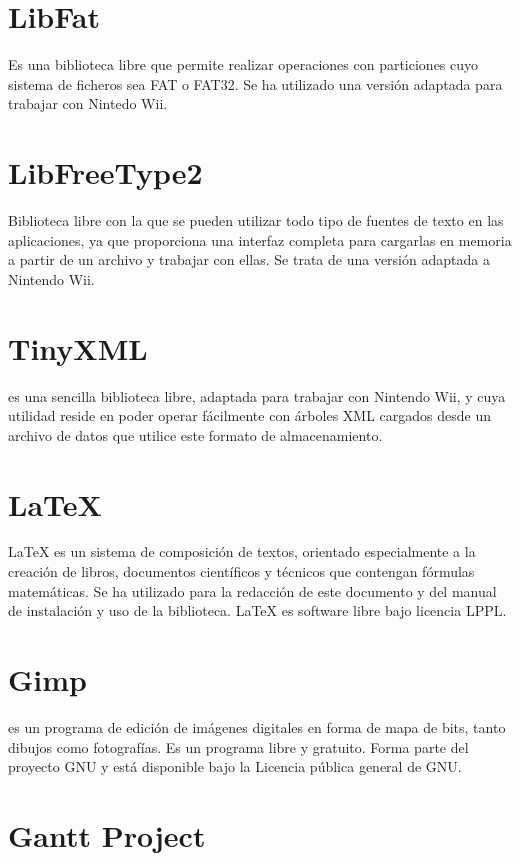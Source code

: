 \section*{LibFat}

Es una biblioteca libre que permite realizar operaciones con particiones cuyo sistema de ficheros sea FAT o FAT32. Se ha utilizado una versión adaptada para trabajar con Nintedo Wii.

\section*{LibFreeType2}

Biblioteca libre con la que se pueden utilizar todo tipo de fuentes de texto en las aplicaciones, ya que proporciona una interfaz completa para cargarlas en memoria a partir de un archivo y trabajar con ellas. Se trata de una versión adaptada a Nintendo Wii.

\section*{TinyXML}

 es una sencilla biblioteca libre, adaptada para trabajar con Nintendo Wii, y cuya utilidad reside en poder operar fácilmente con árboles XML cargados desde un archivo de datos que utilice este formato de almacenamiento.

\section*{\LaTeX}

\LaTeX{} \cite{casc03} es un sistema de composición de textos, orientado especialmente a la creación de libros, documentos científicos y técnicos que contengan fórmulas matemáticas. Se ha utilizado para la redacción de este documento y del manual de instalación y uso de la biblioteca. \LaTeX{} es software libre bajo licencia LPPL.

\section*{Gimp}

 \cite{tril07} es un programa de edición de imágenes digitales en forma de mapa de bits, tanto dibujos como fotografías. Es un programa libre y gratuito. Forma parte del proyecto GNU y está disponible bajo la Licencia pública general de GNU.

\section*{Gantt Project}

